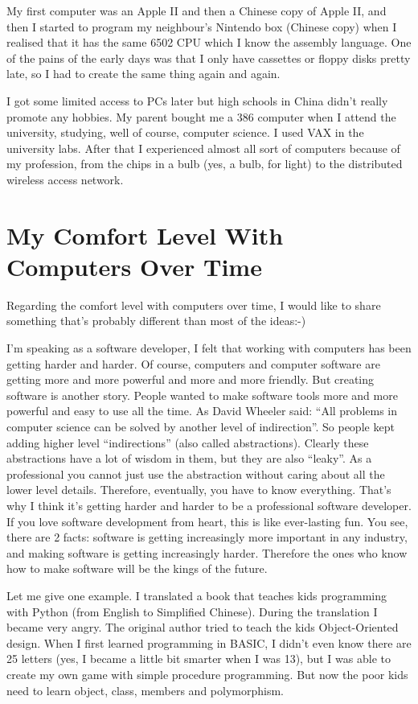 \documentclass[paper=a4, fontsize=11pt]{scrartcl} %
\numberwithin{equation}{section} %
\numberwithin{figure}{section} %
\numberwithin{table}{section} %
\begin{document}
My first computer was an Apple II and then a Chinese copy of Apple II, and then I started to program my neighbour's Nintendo box (Chinese copy) when I realised that it has the same 6502 CPU which I know the assembly language. One of the pains of the early days was that I only have cassettes or floppy disks pretty late, so I had to create the same thing again and again.

I got some limited access to PCs later but high schools in China didn't really promote any hobbies. My parent bought me a 386 computer when I attend the university, studying, well of course, computer science. I used VAX in the university labs. After that I experienced almost all sort of computers because of my profession, from the chips in a bulb (yes, a bulb, for light) to the distributed wireless access network.

\section{My Comfort Level With Computers Over Time}

Regarding the comfort level with computers over time, I would like to share something that's probably different than most of the ideas:-)

I'm speaking as a software developer, I felt that working with computers has been getting harder and harder.
Of course, computers and computer software are getting more and more powerful and more and more friendly.
But creating software is another story. People wanted to make software tools more and more powerful and
easy to use all the time. As David Wheeler said: ``All problems in computer science can be solved by another level of indirection''. So people kept adding higher level ``indirections'' (also called abstractions). Clearly these abstractions have a lot of wisdom in them, but they are also ``leaky''. As a professional you cannot just use the abstraction without caring about all the lower level details. Therefore, eventually, you have to know everything. That's why I think it's getting harder and harder to be a professional software developer. If you love software development from heart, this is like ever-lasting fun. You see, there are 2 facts: software is getting increasingly more important in any industry, and making software is getting increasingly harder. Therefore the ones who know how to make software will be the kings of the future.

Let me give one example. I translated a book that teaches kids programming with Python (from English to Simplified Chinese). During the translation I became very angry. The original author tried to teach the kids Object-Oriented design. When I first learned programming in BASIC, I didn't even know there are 25 letters (yes, I became a little bit smarter when I was 13), but I was able to create my own game with simple procedure programming. But now the poor kids need to learn object, class, members and polymorphism.
\end{document}
